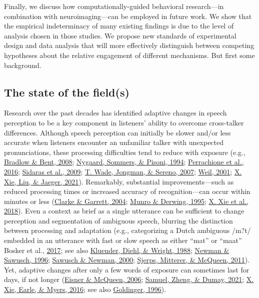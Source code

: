 \documentclass[
  11pt,
  english,
  man,floatsintext]{apa6}
\begin{document}
Finally, we discuss how computationally-guided behavioral research---in combination with neuroimaging---can be employed in future work. We show that the empirical indeterminacy of many existing findings is due to the level of analysis chosen in those studies. We propose new standards of experimental design and data analysis that will more effectively distinguish between competing hypotheses about the relative engagement of different mechanisms. But first some background.

\hypertarget{the-state-of-the-fields}{%
\subsection{The state of the field(s)}\label{the-state-of-the-fields}}

Research over the past decades has identified adaptive changes in speech perception to be a key component in listeners' ability to overcome cross-talker differences. Although speech perception can initially be slower and/or less accurate when listeners encounter an unfamiliar talker with unexpected pronunciations, these processing difficulties tend to reduce with exposure (e.g., \protect\hyperlink{ref-bradlow-bent2008}{Bradlow \& Bent, 2008}; \protect\hyperlink{ref-nygaard1994}{Nygaard, Sommers, \& Pisoni, 1994}; \protect\hyperlink{ref-Perrachione2016}{Perrachione et al., 2016}; \protect\hyperlink{ref-sidaras2009}{Sidaras et al., 2009}; \protect\hyperlink{ref-wade2007}{T. Wade, Jongman, \& Sereno, 2007}; \protect\hyperlink{ref-weil2001a}{Weil, 2001}; \protect\hyperlink{ref-xie2021jep}{X. Xie, Liu, \& Jaeger, 2021}). Remarkably, substantial improvements---such as reduced processing times or increased accuracy of recognition---can occur within minutes or less (\protect\hyperlink{ref-clarke-garrett2004}{Clarke \& Garrett, 2004}; \protect\hyperlink{ref-munro-derwing1995}{Munro \& Derwing, 1995}; \protect\hyperlink{ref-xie2018jasa}{X. Xie et al., 2018}). Even a context as brief as a single utterance can be sufficient to change perception and segmentation of ambiguous speech, blurring the distinction between processing and adaptation (e.g., categorizing a Dutch ambiguous /m?t/ embedded in an utterance with fast or slow speech as either {``mat''} or {``maat''} Bosker et al., \protect\hyperlink{ref-bosker2017}{2017}; see also \protect\hyperlink{ref-kluender1988}{Kluender, Diehl, \& Wright, 1988}; \protect\hyperlink{ref-newman-sawusch1996}{Newman \& Sawusch, 1996}; \protect\hyperlink{ref-sawusch-newman2000}{Sawusch \& Newman, 2000}; \protect\hyperlink{ref-sjerps2011}{Sjerps, Mitterer, \& McQueen, 2011}). Yet, adaptive changes after only a few words of exposure can sometimes last for days, if not longer (\protect\hyperlink{ref-eisner-mcqueen2006}{Eisner \& McQueen, 2006}; \protect\hyperlink{ref-samuel2021}{Samuel, Zheng, \& Dumay, 2021}; \protect\hyperlink{ref-xie2016}{X. Xie, Earle, \& Myers, 2016}; see also \protect\hyperlink{ref-goldinger1996}{Goldinger, 1996}).
\end{document}
